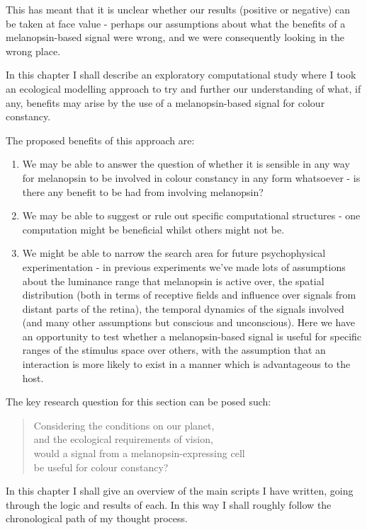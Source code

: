 This has meant that it is unclear whether our results (positive or negative) can be taken at face value - perhaps our assumptions about what the benefits of a melanopsin-based signal were wrong, and we were consequently looking in the wrong place.

In this chapter I shall describe an exploratory computational study where I took an ecological modelling approach to try and further our understanding of what, if any, benefits may arise by the use of a melanopsin-based signal for colour constancy.

\noindent The proposed benefits of this approach are: 
\begin{enumerate}
    \item We may be able to answer the question of whether it is sensible in any way for melanopsin to be involved in colour constancy in any form whatsoever - is there any benefit to be had from involving melanopsin?
    \item We may be able to suggest or rule out specific computational structures - one computation might be beneficial whilst others might not be.
    \item We might be able to narrow the search area for future psychophysical experimentation - in previous experiments we've made lots of assumptions about the luminance range that melanopsin is active over, the spatial distribution (both in terms of receptive fields and influence over signals from distant parts of the retina), the temporal dynamics of the signals involved (and many other assumptions but conscious and unconscious). Here we have an opportunity to test whether a melanopsin-based signal is useful for specific ranges of the stimulus space over others, with the assumption that an interaction is more likely to exist in a manner which is advantageous to the host.
\end{enumerate}

\noindent The key research question for this section can be posed such:

\begin{quote}
Considering the conditions on our planet, \\
and the ecological requirements of vision, \\
would a signal from a melanopsin-expressing cell \\
be useful for colour constancy?
\end{quote}

In this chapter I shall give an overview of the main scripts I have written, going through the logic and results of each. In this way I shall roughly follow the chronological path of my thought process.

